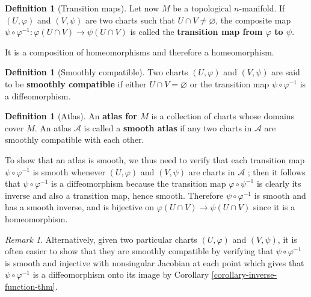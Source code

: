 \documentclass[reqno]{amsart}
\theoremstyle{plain}%
\theoremstyle{definition}
\newtheorem{definition}[theorem]{Definition}
\theoremstyle{remark}
\newtheorem*{remark}{Remark}
\begin{document}
            \begin{definition}[Transition maps]
                Let now $M$ be a topological $n$-manifold. If $\left( U, \varphi \right) $ 
            and $(V, \psi)$ are two charts such that $U \cap V \neq \varnothing$, the
            composite map $\psi \circ \varphi^{-1}  \colon
            \varphi \left( U \cap V \right) \to \psi \left( U \cap V \right) $ is called 
            the \textbf{transition map from $\varphi$ to $\psi$}.
            \end{definition}
            It is a composition of homeomorphisms and therefore a homeomorphism.
            \begin{definition}[Smoothly compatible]
                Two charts $\left( U, \varphi \right) $ and $\left( V, \psi \right) $ are
                said to be \textbf{smoothly compatible} if either $U \cap V = \varnothing$ 
                or the transition map $\psi \circ \varphi^{-1}$ is a diffeomorphism.
            \end{definition}
            \begin{definition}[Atlas]
                An \textbf{atlas for $M$} is a collection of charts whose domains cover
                $M$. An atlas $\mathcal{A}$ is called a \textbf{smooth atlas} if any two
                charts in $\mathcal{A}$ are smoothly compatible with each other.
            \end{definition}
            To show that an atlas is smooth, we thus need to verify that each transition
            map $\psi \circ \varphi^{-1}$ is smooth whenever $\left( U, \varphi \right)
            $ and
            $\left( V, \psi \right) $ are charts in $\mathcal{A}$ ; then it follows that
            $\psi \circ \varphi^{-1}$ is a diffeomorphism because the transition map
            $\varphi \circ \psi^{-1}$ is clearly its inverse and also a transition map,
            hence smooth. Therefore $\psi \circ \varphi^{-1}$ is smooth and has a smooth
            inverse, and is bijective on $\varphi \left( U \cap V \right) 
            \to \psi \left( U \cap V \right) $ since it is a homeomorphism.\\

            \begin{remark}
                Alternatively, given two particular charts $\left( U, \varphi \right) $ and
                $\left( V, \psi \right) $, it is often easier to show that they are
                smoothly compatible by verifying that $\psi \circ \varphi^{-1}$ is smooth
                and injective with nonsingular Jacobian at each point which gives that
                $\psi \circ \varphi^{-1}$ is a diffeomorphism onto its image by Corollary
                \ref{corollary-inverse-function-thm}.
            \end{remark}
\end{document}
